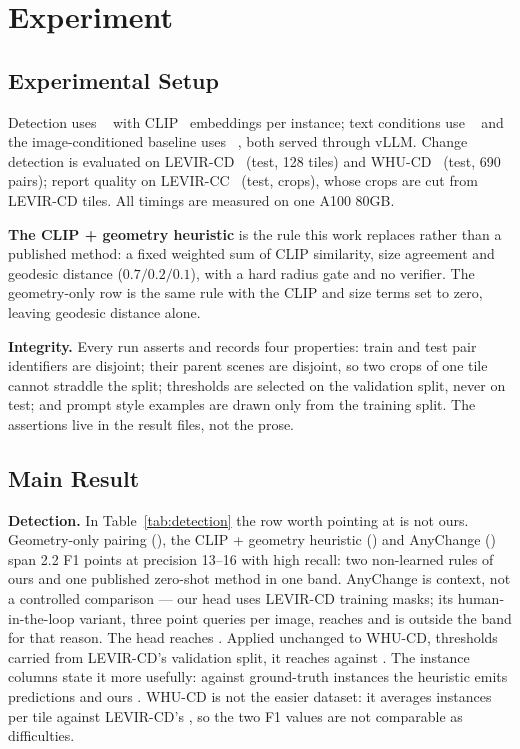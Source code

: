 \section{Experiment}
\label{sec:experiments}

\subsection{Experimental Setup}

Detection uses \DetectorName~\cite{sam3} with CLIP~\cite{radford2021learning}
embeddings per instance; text conditions use \LLMName~\cite{exaone4} and the
image-conditioned baseline uses \VLMName~\cite{qwen25vl}, both served through
vLLM. Change detection is evaluated on LEVIR-CD~\cite{chen2020spatial} (test,
128 tiles) and WHU-CD~\cite{ji2019fully} (test, 690 pairs); report quality on
LEVIR-CC~\cite{liu2022remote} (test, \EFourNCrops{} crops), whose crops are
cut from LEVIR-CD tiles. All timings are measured on one A100 80GB.

\textbf{The CLIP + geometry heuristic} is the rule this work replaces rather
than a published method: a fixed weighted sum of CLIP similarity, size
agreement and geodesic distance ($0.7/0.2/0.1$), with a hard radius gate and no
verifier.
The geometry-only row is the same rule with the CLIP and size terms set to
zero, leaving geodesic distance alone.

\textbf{Integrity.} Every run asserts and records four properties: train and
test pair identifiers are disjoint; their parent scenes are disjoint, so two
crops of one tile cannot straddle the split; thresholds are selected on the
validation split, never on test; and prompt style examples are drawn only from
the training split. The assertions live in the result files, not the prose.

\subsection{Main Result}



\textbf{Detection.} In Table~\ref{tab:detection} the row worth pointing at is
not ours. Geometry-only pairing (\EOneGeoFOne), the CLIP + geometry heuristic
(\EOneHeuristicFOne) and AnyChange (\AnyChangeFOne) span 2.2 F1 points at
precision 13--16 with high recall: two non-learned rules of ours and one
published zero-shot method in one band. AnyChange is context, not a controlled
comparison --- our head uses LEVIR-CD training masks; its human-in-the-loop
variant, three point queries per image, reaches \AnyChangeHFOne{} and is
outside the band for that reason. The head reaches
\EOnePixelFOne. Applied unchanged to WHU-CD, thresholds carried from LEVIR-CD's
validation split, it reaches \ETwoPixelFOne{} against \ETwoHeuristicFOne.
The instance columns state it more usefully: against \ETwoNGT{} ground-truth
instances the heuristic emits \ETwoHeuristicNPred{} predictions and ours
\ETwoNPred. WHU-CD is not the easier
dataset: it averages \ETwoGTDensity{} instances per tile against LEVIR-CD's
\EOneGTDensity, so the two F1 values are not comparable as difficulties.

